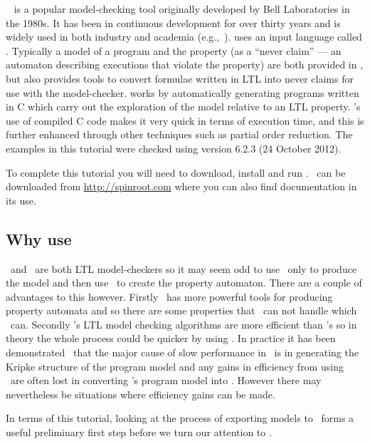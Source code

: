 \documentclass[a4]{article}
\begin{document}
\spin{}~\cite{holzmann04spin} is a popular model-checking tool
originally developed by Bell Laboratories in the 1980s.  It has been
in continuous development for over thirty years and is widely used in
both industry and academia
(e.g.,~\cite{havelund00formal,kars96application,kirsch11technical}).
\spin{} uses an input language called \promela{}.  Typically a model
of a program and the property (as a ``never claim'' --- an automaton
describing executions that violate the property) are both provided in
\promela{}, but \spin{} also provides tools to convert formulae
written in LTL into never claims for use with the
model-checker. \spin{} works by automatically generating programs
written in C which carry out the exploration of the model relative to
an LTL property. \spin{}'s use of compiled C code makes it very quick
in terms of execution time, and this is further enhanced through other
techniques such as partial order reduction. The examples in this tutorial were checked using \spin{} version 6.2.3 (24 October 2012).

To complete this tutorial you will need to download, install and run \spin.  \spin\ can be downloaded from \url{http://spinroot.com} where you can also find documentation in its use.

\subsection{Why use \spin{}}

\spin\ and \ajpf\ are both LTL model-checkers so it may seem odd to use \ajpf\ only to produce the model and then use \spin\ to create the property automaton.  There are a couple of advantages to this however.  Firstly \spin\ has more powerful tools for producing property automata and so there are some properties that \ajpf\ can not handle which \spin\ can.  Secondly \spin's LTL model checking algorithms are more efficient than \ajpf's so in theory the whole process could be quicker by using \spin.  In practice it has been demonstrated~\cite{dennis15:_two} that the major cause of slow performance in \ajpf\ is in generating the Kripke structure of the program model and any gains in efficiency from using \spin\ are often lost in converting \ajpf's program model into \promela{}.  However there may  nevertheless be situations where efficiency gains can be made.  

In terms of this tutorial, looking at the process of exporting models to \spin\ forms a useful preliminary first step before we turn our attention to \prism.
\end{document}
